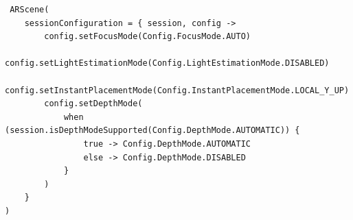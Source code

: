 \begin{verbatim}
 ARScene(
    sessionConfiguration = { session, config ->
        config.setFocusMode(Config.FocusMode.AUTO)
        config.setLightEstimationMode(Config.LightEstimationMode.DISABLED)
        config.setInstantPlacementMode(Config.InstantPlacementMode.LOCAL_Y_UP)
        config.setDepthMode(
            when (session.isDepthModeSupported(Config.DepthMode.AUTOMATIC)) {
                true -> Config.DepthMode.AUTOMATIC
                else -> Config.DepthMode.DISABLED
            }
        )
    }
)   
\end{verbatim}